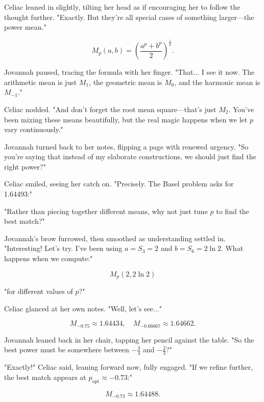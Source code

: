 \smallskip \noindent
Celiac leaned in slightly, tilting her head as if encouraging her to follow the thought further. "Exactly. But they’re all special cases of something larger—the power mean."

\smallskip \noindent
\[
M_p(a,b) = \left(\frac{a^p+b^p}{2}\right)^{\frac{1}{p}}.
\]

\smallskip \noindent
Jovannah paused, tracing the formula with her finger. "That... I see it now. The arithmetic mean is just \( M_1 \), the geometric mean is \( M_0 \), and the harmonic mean is \( M_{-1} \)."

\smallskip \noindent
Celiac nodded. "And don’t forget the root mean square—that’s just \( M_2 \). You’ve been mixing these means beautifully, but the real magic happens when we let \( p \) vary continuously."

\smallskip \noindent
Jovannah turned back to her notes, flipping a page with renewed urgency. "So you’re saying that instead of my elaborate constructions, we should just find the right power?"

\smallskip \noindent
Celiac smiled, seeing her catch on. "Precisely. The Basel problem asks for 1.64493:"

\smallskip \noindent
"Rather than piecing together different means, why not just tune \( p \) to find the best match?"

\smallskip \noindent
Jovannah’s brow furrowed, then smoothed as understanding settled in. "Interesting! Let’s try. I’ve been using \( a = S_3 = 2 \) and \( b = S_6 = 2\ln2 \). What happens when we compute:"

\smallskip \noindent
\[
M_p(2,2\ln2)
\]

\smallskip \noindent
"for different values of \( p \)?"

\smallskip \noindent
Celiac glanced at her own notes. "Well, let’s see..."

\smallskip \noindent
\[
M_{-0.75} \approx 1.64434, \quad M_{-0.66667} \approx 1.64662.
\]

\smallskip \noindent
Jovannah leaned back in her chair, tapping her pencil against the table. "So the best power must be somewhere between \( -\frac{3}{4} \) and \( -\frac{2}{3} \)?"

\smallskip \noindent
"Exactly!" Celiac said, leaning forward now, fully engaged. "If we refine further, the best match appears at \(p_{\text{opt}} \approx -0.73\):"

\smallskip \noindent
\[ M_{-0.73} \approx 1.64488.
\]

